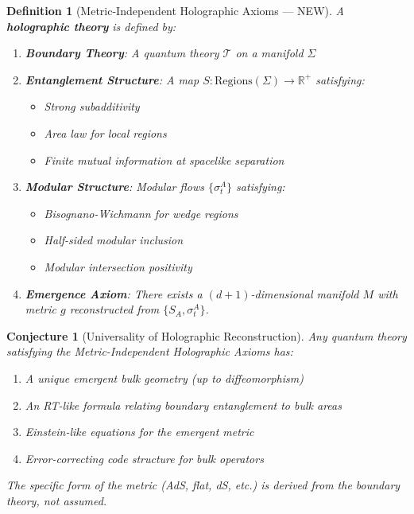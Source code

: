 \documentclass[12pt,a4paper]{article}
\newtheorem{conjecture}[theorem]{Conjecture}
\newtheorem{definition}[theorem]{Definition}
\begin{document}
\begin{definition}[Metric-Independent Holographic Axioms --- NEW]
A \textbf{holographic theory} is defined by:
\begin{enumerate}
    \item \textbf{Boundary Theory}: A quantum theory $\mathcal{T}$ on a manifold $\Sigma$
    \item \textbf{Entanglement Structure}: A map $S: \text{Regions}(\Sigma) \to \mathbb{R}^+$ satisfying:
    \begin{itemize}
        \item Strong subadditivity
        \item Area law for local regions
        \item Finite mutual information at spacelike separation
    \end{itemize}
    \item \textbf{Modular Structure}: Modular flows $\{\sigma_t^A\}$ satisfying:
    \begin{itemize}
        \item Bisognano-Wichmann for wedge regions
        \item Half-sided modular inclusion
        \item Modular intersection positivity
    \end{itemize}
    \item \textbf{Emergence Axiom}: There exists a $(d+1)$-dimensional manifold $M$ with metric $g$ reconstructed from $\{S_A, \sigma_t^A\}$.
\end{enumerate}
\end{definition}

\begin{conjecture}[Universality of Holographic Reconstruction]
Any quantum theory satisfying the Metric-Independent Holographic Axioms has:
\begin{enumerate}
    \item A unique emergent bulk geometry (up to diffeomorphism)
    \item An RT-like formula relating boundary entanglement to bulk areas
    \item Einstein-like equations for the emergent metric
    \item Error-correcting code structure for bulk operators
\end{enumerate}
The specific form of the metric (AdS, flat, dS, etc.) is \textit{derived} from the boundary theory, not assumed.
\end{conjecture}
\end{document}
